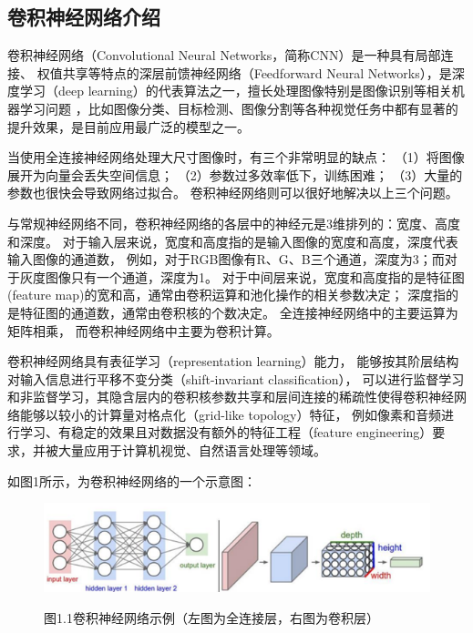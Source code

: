 \documentclass[10.5pt,compsoc,UTF8]{CjC}
\theoremstyle{mystyle}
\begin{document}
\subsection{卷积神经网络介绍}
卷积神经网络（Convolutional Neural Networks，简称CNN）是一种具有局部连接、
权值共享等特点的深层前馈神经网络（Feedforward Neural Networks），是深度学习（deep learning）的代表算法之一，擅长处理图像特别是图像识别等相关机器学习问题
，比如图像分类、目标检测、图像分割等各种视觉任务中都有显著的提升效果，是目前应用最广泛的模型之一。

当使用全连接神经网络处理大尺寸图像时，有三个非常明显的缺点：
（1）将图像展开为向量会丢失空间信息；
（2）参数过多效率低下，训练困难；
（3）大量的参数也很快会导致网络过拟合。
卷积神经网络则可以很好地解决以上三个问题。

与常规神经网络不同，卷积神经网络的各层中的神经元是3维排列的：宽度、高度和深度。
对于输入层来说，宽度和高度指的是输入图像的宽度和高度，深度代表输入图像的通道数，
例如，对于RGB图像有R、G、B三个通道，深度为3；而对于灰度图像只有一个通道，深度为1。
对于中间层来说，宽度和高度指的是特征图(feature map)的宽和高，通常由卷积运算和池化操作的相关参数决定；
深度指的是特征图的通道数，通常由卷积核的个数决定。
全连接神经网络中的主要运算为矩阵相乘，
而卷积神经网络中主要为卷积计算。


卷积神经网络具有表征学习（representation learning）能力，
能够按其阶层结构对输入信息进行平移不变分类（shift-invariant classification），
可以进行监督学习和非监督学习，其隐含层内的卷积核参数共享和层间连接的稀疏性使得卷积神经网络能够以较小的计算量对格点化（grid-like topology）特征，
例如像素和音频进行学习、有稳定的效果且对数据没有额外的特征工程（feature engineering）要求，并被大量应用于计算机视觉、自然语言处理等领域。

如图1所示，为卷积神经网络的一个示意图：
\begin{figure}[htbp]
\centering
\centerline{\includegraphics[width=1\linewidth]{CNN1.png}}

\heiti 图1.1\quad  卷积神经网络示例（左图为全连接层，右图为卷积层）
\label{fig1}
\end{figure}



\end{document}

